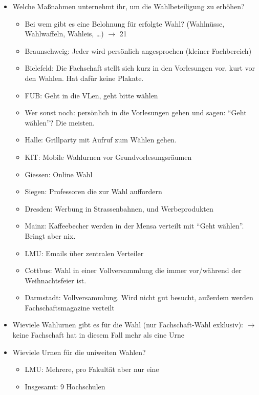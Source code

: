\begin{itemize}
          \item Welche Maßnahmen unternehmt ihr, um die Wahlbeteiligung zu erhöhen?
            \begin{itemize}
              \item Bei wem gibt es eine Belohnung für erfolgte Wahl? (Wahlnüsse, Wahlwaffeln, Wahleis, …) $\rightarrow$ 21
              \item Braunschweig: Jeder wird persönlich angesprochen (kleiner Fachbereich)
              \item Bielefeld: Die Fachschaft stellt sich kurz in den Vorlesungen vor, kurt vor den Wahlen. Hat dafür keine Plakate.
              \item FUB: Geht in die VLen, geht bitte wählen
              \item Wer sonst noch: persönlich in die Vorlesungen gehen und sagen: “Geht wählen”? Die meisten.
              \item Halle: Grillparty mit Aufruf zum Wählen gehen.
              \item KIT: Mobile Wahlurnen vor Grundvorlesungsräumen
              \item Giessen: Online Wahl
              \item Siegen: Professoren die zur Wahl auffordern
              \item Dresden: Werbung in Strassenbahnen, und Werbeprodukten
              \item Mainz: Kaffeebecher werden in der Mensa verteilt mit “Geht wählen”. Bringt aber nix.
              \item LMU: Emails über zentralen Verteiler
              \item Cottbus: Wahl in einer Vollversammlung die immer vor/während der Weihnachtsfeier ist.
              \item Darmstadt: Vollversammlung. Wird nicht gut besucht, außerdem werden Fachschaftsmagazine verteilt
            \end{itemize}

          \item Wieviele Wahlurnen gibt es für die Wahl (nur Fachschaft-Wahl exklusiv):
            $\rightarrow$ keine Fachschaft hat in diesem Fall mehr als eine Urne

          \item Wieviele Urnen für die uniweiten Wahlen?
            \begin{itemize}
              \item LMU: Mehrere, pro Fakultät aber nur eine
              \item Insgesamt: 9 Hochschulen
            \end{itemize}


\end{itemize}
